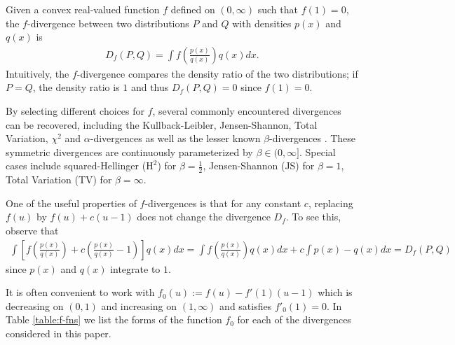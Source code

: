 
Given a convex real-valued function $f$ defined on $(0, \infty)$ such that $f(1)=0$, the $f$-divergence between two distributions $P$ and $Q$ with densities $p(x)$ and $q(x)$ is
%
\begin{align*}
D_f(P, Q) = \int f\left(\frac{p(x)}{q(x)}\right) q(x) dx.
\end{align*}
%
Intuitively, the $f$-divergence compares the density ratio of the two distributions; if $P=Q$, the density ratio is $1$ and thus $D_f(P,Q) = 0$ since $f(1)=0$. 

By selecting different choices for $f$, several commonly encountered divergences can be recovered, including the Kullback-Leibler, Jensen-Shannon, Total Variation, $\chi^2$ and $\alpha$-divergences as well as the lesser known $\beta$-divergences \cite{osterreicher2003new}.
These symmetric divergences are continuously parameterized by $\beta\in(0, \infty]$. Special cases include squared-Hellinger ($\mathrm{H}^2$) for ${\beta=\frac{1}{2}}$,  Jensen-Shannon (JS) for $\beta=1$, Total Variation (TV) for $\beta=\infty$. 

One of the useful properties of $f$-divergences is that for any constant $c$, replacing $f(u)$ by $f(u) + c(u-1)$ does not change the divergence $D_f$. 
To see this, observe that
%
\begin{align*}
\int \left[ f\left(\frac{p(x)}{q(x)}\right) + c\left(\frac{p(x)}{q(x)} - 1\right) \right] q(x) dx = 
\int f\left(\frac{p(x)}{q(x)}\right) q(x) dx + c \int p(x) - q(x) dx = D_f(P, Q)
\end{align*}
%
since $p(x)$ and $q(x)$ integrate to $1$.

It is often convenient to work with $f_0(u) := f(u) - f'(1)(u-1)$ which is decreasing on $(0, 1)$ and increasing on $(1, \infty)$ and satisfies $f'_0(1)=0$.
In Table \ref{table:f-fns} we list the forms of the function $f_0$ for each of the divergences considered in this paper.






